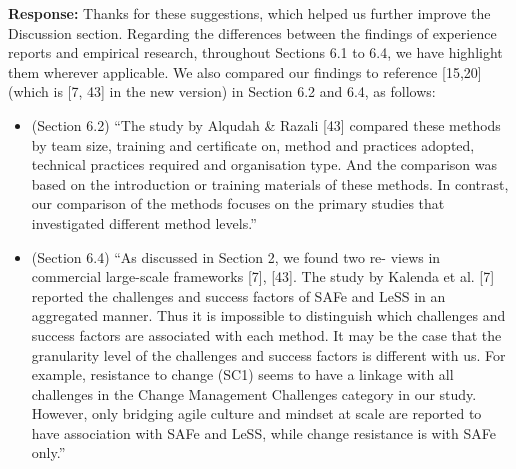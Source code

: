 \documentclass[a4paper,twoside,11pt]{reviewresponse}
\begin{document}
\textbf{Response:} Thanks for these suggestions, which helped us further improve the Discussion section. Regarding the differences between the findings of experience reports and empirical research, throughout Sections 6.1 to 6.4, we have highlight them wherever applicable. We also compared our findings to reference [15,20] (which is [7, 43] in the new version) in Section 6.2 and 6.4, as follows:
\begin{itemize}
	\item (Section 6.2) ``The study by Alqudah \& Razali [43] compared these methods by team size, training and certificate on, method and practices adopted, technical practices required and organisation type. And the comparison was based on the introduction or training materials of these methods. In contrast, our comparison of the methods focuses on the primary studies that investigated different method levels.''
	\item (Section 6.4) ``As discussed in Section 2, we found two re- views in commercial large-scale frameworks [7], [43]. The study by Kalenda et al. [7] reported the challenges and success factors of SAFe and LeSS in an aggregated manner. Thus it is impossible to distinguish which challenges and success factors are associated with each method. It may be the case that the granularity level of the challenges and success factors is different with us. For example, resistance to change (SC1) seems to have a linkage with all challenges in the Change Management Challenges category in our study. However, only bridging agile culture and mindset at scale are reported to have association with SAFe and LeSS, while change resistance is with SAFe only.''
\end{itemize}

\clearpage
\end{document}

